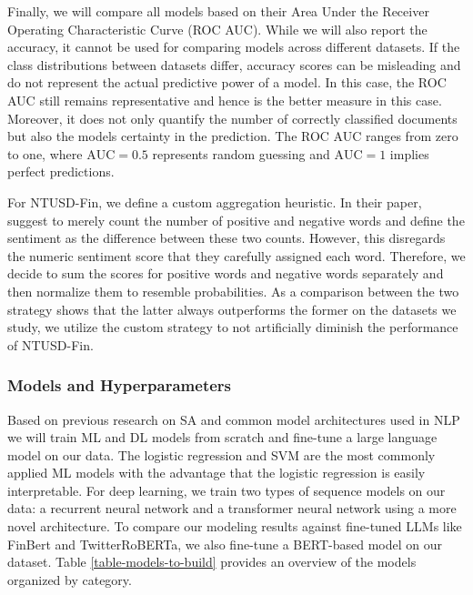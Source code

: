 

Finally, we will compare all models based on their Area Under the Receiver Operating Characteristic Curve (ROC AUC). While we will also report the accuracy, it cannot be used for comparing models across different datasets. If the class distributions between datasets differ, accuracy scores can be misleading and do not represent the actual predictive power of a model. In this case, the ROC AUC still remains representative and hence is the better measure in this case. Moreover, it does not only quantify the number of correctly classified documents but also the models certainty in the prediction. The ROC AUC ranges from zero to one, where $\textrm{AUC}=0.5$ represents random guessing and $\textrm{AUC}=1$ implies perfect predictions.

For NTUSD-Fin, we define a custom aggregation heuristic. In their paper,  suggest to merely count the number of positive and negative words and define the sentiment as the difference between these two counts. However, this disregards the numeric sentiment score that they carefully assigned each word. Therefore, we decide to sum the scores for positive words and negative words separately and then normalize them to resemble probabilities. As a comparison between the two strategy shows that the latter always outperforms the former on the datasets we study, we utilize the custom strategy to not artificially diminish the performance of NTUSD-Fin.

\subsubsection{Models and Hyperparameters}
Based on previous research on SA and common model architectures used in NLP we will train ML and DL models from scratch and fine-tune a large language model on our data. The logistic regression and SVM are the most commonly applied ML models with the advantage that the logistic regression is easily interpretable. For deep learning, we train two types of sequence models on our data: a recurrent neural network and a transformer neural network using a more novel architecture. To compare our modeling results against fine-tuned LLMs like FinBert and TwitterRoBERTa, we also fine-tune a BERT-based model on our dataset. Table \ref{table-models-to-build} provides an overview of the models organized by category.


